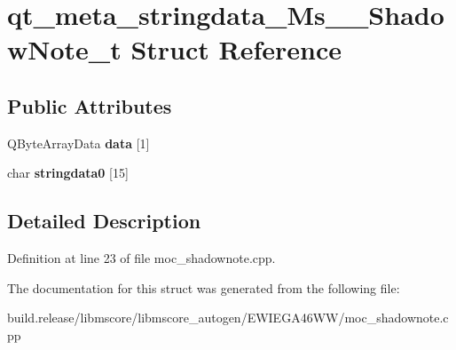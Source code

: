 \hypertarget{structqt__meta__stringdata___ms_____shadow_note__t}{}\section{qt\+\_\+meta\+\_\+stringdata\+\_\+\+Ms\+\_\+\+\_\+\+Shadow\+Note\+\_\+t Struct Reference}
\label{structqt__meta__stringdata___ms_____shadow_note__t}
\subsection*{Public Attributes}
\begin{DoxyCompactItemize}
\item 
\mbox{\label{structqt__meta__stringdata___ms_____shadow_note__t_ac40bf91717624dc32b2bbd22c5ff7864}} 
Q\+Byte\+Array\+Data {\bfseries data} \mbox{[}1\mbox{]}
\item 
\mbox{\label{structqt__meta__stringdata___ms_____shadow_note__t_a00da1ab64904115ee0e645b4e828d356}} 
char {\bfseries stringdata0} \mbox{[}15\mbox{]}
\end{DoxyCompactItemize}


\subsection{Detailed Description}


Definition at line 23 of file moc\+\_\+shadownote.\+cpp.



The documentation for this struct was generated from the following file\+:\begin{DoxyCompactItemize}
\item 
build.\+release/libmscore/libmscore\+\_\+autogen/\+E\+W\+I\+E\+G\+A46\+W\+W/moc\+\_\+shadownote.\+cpp\end{DoxyCompactItemize}
